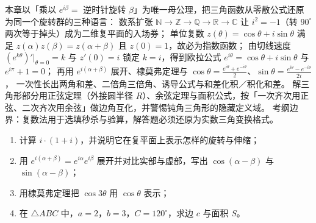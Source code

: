\begin{explore}
\begin{summary}
本章以「乘以 $e^{i\beta}=$ 逆时针旋转 $\beta$」为唯一母公理，把三角函数从零散公式还原为同一个旋转群的三种语言：
数系扩张 $\mathbb{N}\to\mathbb{Z}\to\mathbb{Q}\to\mathbb{R}\to\mathbb{C}$ 让 $i^2=-1$（转 $90^\circ$ 两次等于掉头）成为二维复平面的入场券；
单位复数 $z(\theta)=\cos\theta+i\sin\theta$ 满足 $z(\alpha)z(\beta)=z(\alpha+\beta)$ 且 $z(0)=1$，故必为指数函数；
由切线速度 $(e^{k\theta})'\big|_{\theta=0}=k$ 与 $z'(0)=i$ 锁定 $k=i$，得到欧拉公式 $e^{i\theta}=\cos\theta+i\sin\theta$ 与 $e^{i\pi}+1=0$；
再用 $e^{i(\alpha+\beta)}$ 展开、棣莫弗定理与 $\cos\theta=\frac{e^{i\theta}+e^{-i\theta}}2$、$\sin\theta=\frac{e^{i\theta}-e^{-i\theta}}{2i}$，
一次性长出两角和差、二倍角三倍角、诱导公式与和差化积／积化和差。
解三角形部分用正弦定理（外接圆半径 $R$）、余弦定理与面积公式，按「一次齐次用正弦、二次齐次用余弦」做边角互化，并警惕钝角三角形的隐藏定义域。
考纲边界：复数法用于选填秒杀与验算，解答题必须还原为实数三角变换格式。
\end{summary}

\end{explore}

\begin{inclasstest}
\begin{enumerate}
  \item 计算 $i\cdot(1+i)$，并说明它在复平面上表示怎样的旋转与伸缩；
  \item 用 $e^{i(\alpha+\beta)}=e^{i\alpha}e^{i\beta}$ 展开并对比实部与虚部，写出 $\cos(\alpha-\beta)$ 与 $\sin(\alpha-\beta)$；
  \item 用棣莫弗定理把 $\cos3\theta$ 用 $\cos\theta$ 表示；
  \item 在 $\triangle ABC$ 中，$a=2$，$b=3$，$C=120^\circ$，求边 $c$ 与面积 $S$。
\end{enumerate}
\end{inclasstest}

